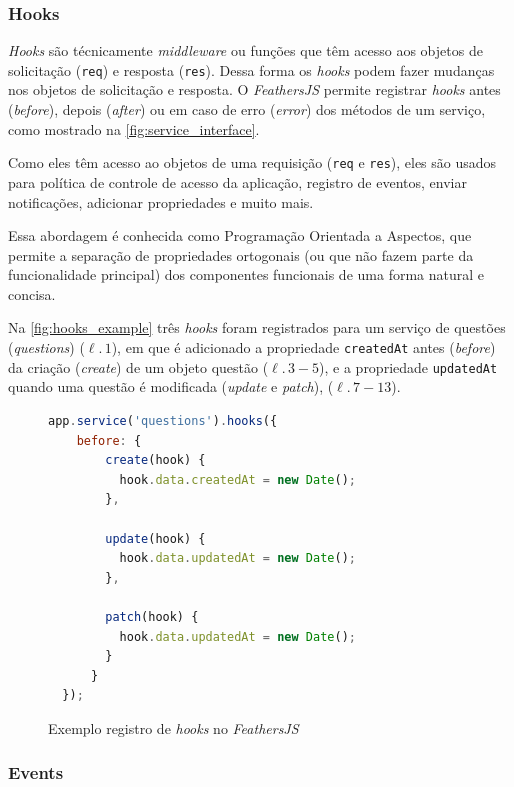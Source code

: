 \subsubsection{Hooks}

\textit{Hooks} são técnicamente \textit{middleware} ou funções que têm acesso aos
objetos de solicitação (\texttt{req}) e resposta (\texttt{res}).
Dessa forma os \textit{hooks} podem fazer mudanças nos objetos de solicitação e resposta.
O \textit{\textit{FeathersJS}} permite registrar \textit{hooks} antes (\textit{before}), depois
(\textit{after}) ou em caso de erro (\textit{error}) dos métodos de
um serviço, como mostrado na \autoref{fig:service_interface}.

Como eles têm acesso ao objetos de uma requisição (\texttt{req} e \texttt{res}), eles são usados
para política de controle de acesso da aplicação, registro de eventos, enviar
notificações, adicionar propriedades e muito mais.

Essa abordagem é conhecida como Programação Orientada a Aspectos, que permite
a separação de propriedades ortogonais (ou que não fazem parte da funcionalidade
principal) dos componentes funcionais de uma forma natural e concisa.

Na \autoref{fig:hooks_example} três \textit{hooks} foram registrados para um serviço de questões (\textit{questions}) ($\ell.\,1$),
em que é adicionado a propriedade \texttt{createdAt} antes (\textit{before}) da criação (\textit{create}) de um objeto questão ($\ell.\,3-5$),
e a propriedade \texttt{updatedAt} quando uma questão é modificada (\textit{update} e \textit{patch}), ($\ell.\,7-13$).

\begin{figure}[h]
\caption{Exemplo registro de \textit{hooks} no \textit{\textit{FeathersJS}}}
\label{fig:hooks_example}
\begin{lstlisting}[language=JavaScript]
  app.service('questions').hooks({
    before: {
        create(hook) {
          hook.data.createdAt = new Date();
        },

        update(hook) {
          hook.data.updatedAt = new Date();
        },

        patch(hook) {
          hook.data.updatedAt = new Date();
        }
      }
  });
\end{lstlisting}
\doautor
\end{figure}

\subsubsection{Events}

